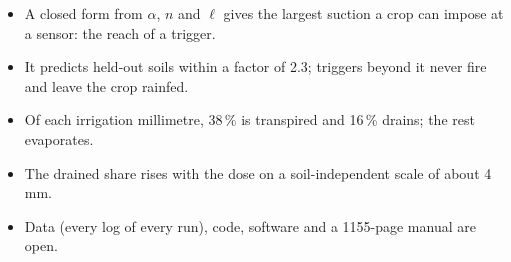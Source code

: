 \begin{itemize}[nosep,leftmargin=1.2em]
\item A closed form from $\alpha$, $n$ and $\ell$ gives the largest suction a crop can impose at a sensor: the reach of a trigger.
\item It predicts held-out soils within a factor of 2.3; triggers beyond it never fire and leave the crop rainfed.
\item Of each irrigation millimetre, 38\,\% is transpired and 16\,\% drains; the rest evaporates.
\item The drained share rises with the dose on a soil-independent scale of about 4\,mm.
\item Data (every log of every run), code, software and a 1155-page manual are open.
\end{itemize}